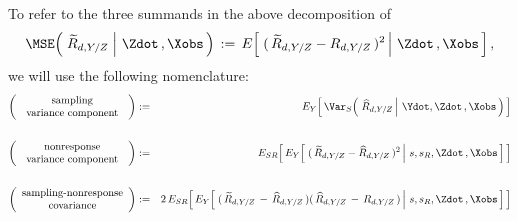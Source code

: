 \vskip 0.75cm
\noindent
To refer to the three summands in the above decomposition of
\begin{equation*}
\MSE\!\left(\,
    \left.
    \widetilde{R}_{d,Y/Z}
    \;\right\vert\,
    \Zdot\,,\Xobs
    \,\right)
\, := \,
    E\!\left[\,
        \left.
        (\,\widetilde{R}_{d,Y/Z} - R_{d,Y/Z}\,)^{2}
        \,\right\vert\,
        \Zdot\,,\Xobs
        \,\right],
\end{equation*}
we will use the following nomenclature:
\vskip 0.01cm
\begin{eqnarray*}
\left(\begin{array}{c}
    \textnormal{sampling}
    \\
    \textnormal{\;\,variance component\;\,}
    \end{array}\right)
& := &
    E_{Y}\!\left[\,
    \Var_{S}\!\left(\,
        \left.
        \widehat{R}_{d,Y/Z}
        \,\right\vert\,
        \Ydot,
        \Zdot\,,\Xobs
        \,\right)
        \,\right]
\\ \\
\left(\begin{array}{c}
    \textnormal{nonresponse}
    \\
    \textnormal{\;\,variance component\;\,}
    \end{array}\right)
& := &
    E_{SR}\!\left[\,
    E_{Y}\!\left[\,
        \left.
        (\,\widetilde{R}_{d,Y/Z} - \widehat{R}_{d,Y/Z}\,)^{2}
        \,\right\vert\,
        s,s_{R},\Zdot\,,\Xobs
        \,\right]
        \,\right]
\\ \\
\left(\begin{array}{c}
    \textnormal{sampling-nonresponse}
    \\
    \textnormal{covariance}
    \end{array}\right)
& := &
    2\,
    E_{SR}\!\left[\,
    E_{Y}\!\left[\,
        \left.
        (\,\widetilde{R}_{d,Y/Z} \,-\, \widehat{R}_{d,Y/Z}\,)(\,\widehat{R}_{d,Y/Z} \,-\, R_{d,Y/Z}\,)
        \,\right\vert\,
        s,s_{R},\Zdot\,,\Xobs
        \,\right]
        \,\right]
\end{eqnarray*}
